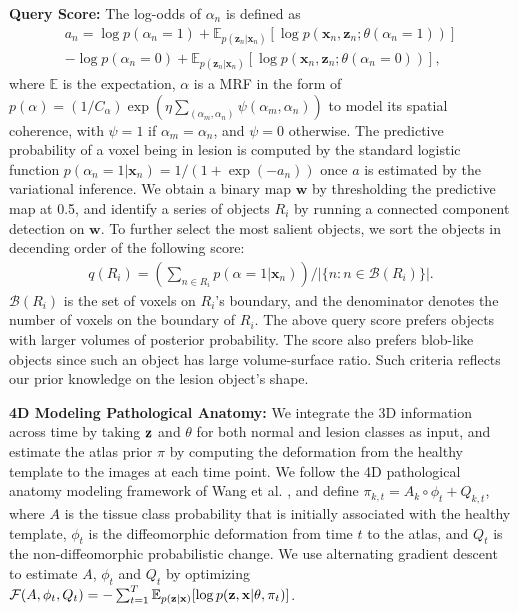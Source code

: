 \documentclass{article}
\renewcommand{\vec}[1]{\boldsymbol{#1}}
\newcommand{\mat}[1]{\text{\bf #1}}
\begin{document}
\noindent\textbf{Query Score: }The log-odds of $\alpha_n$ is defined as
\begin{align*}
  a_n = \log p(\alpha_n=1) + \mathbb{E}_{p(\vec z_n|\vec x_n)} [\log p(\vec x_n, \vec z_n; \theta (\alpha_n=1))]\\
  - \log p(\alpha_n=0) + \mathbb{E}_{p(\vec z_n|\vec x_n)} [\log p(\vec x_n, \vec z_n; \theta (\alpha_n=0))],
\end{align*}
where $\mathbb{E}$ is the expectation, $\alpha$ is a MRF in the form of
$p(\alpha) = (1/C_{\alpha})\exp (\eta \sum_{(\alpha_m, \alpha_n)} \psi(\alpha_m,
\alpha_n ) )$ to model its spatial coherence, with $\psi =1$ if $\alpha_m =
\alpha_n$, and $\psi = 0$ otherwise. The predictive probability of a voxel being
in lesion is computed by the standard logistic function $p(\alpha_n=1|\vec x_n)
= 1/ (1 + \exp (-a_n))$ once $a$ is estimated by the variational inference. We
obtain a binary map $\vec w$ by thresholding the predictive map at 0.5, and
identify a series of objects $R_i$ by running a connected component detection on
$\vec w$. To further select the most salient objects, we sort the objects in
decending order of the following score:
\begin{align}
q(R_i) = \left (\sum_{n\in R_i} p(\alpha = 1| \vec x_n)  \right ) \Big /  \vert\{n: n\in \mathcal{B}(R_i) \}\vert.
\label{eq:score}
\end{align}
$\mathcal{B}(R_i)$ is the set of voxels on $R_i$'s boundary, and the denominator
denotes the number of voxels on the boundary of $R_i$. The above query score
prefers objects with larger volumes of posterior probability. The score also
prefers blob-like objects since such an object has large volume-surface
ratio. Such criteria reflects our prior knowledge on the lesion object's shape.


\noindent\textbf{4D Modeling Pathological Anatomy: }
We integrate the 3D information across time by taking $\mat z$ and $\theta$ for
both normal and lesion classes as input, and estimate the atlas prior $\pi$ by
computing the deformation from the healthy template to the images at each time
point. We follow the 4D pathological anatomy modeling framework of Wang et
al. \cite{WangMBIA2013}, and define $\pi_{k,t} = A_k \circ \phi_t + Q_{k,t}$,
where $A$ is the tissue class probability that is initially associated with the
healthy template, $\phi_t$ is the diffeomorphic deformation from time $t$ to the
atlas, and $Q_t$ is the non-diffeomorphic probabilistic change. We use alternating
gradient descent to estimate $A$, $\phi_t$ and $Q_t$ by optimizing
$\mathcal{F}(A, \phi_t, Q_t) = - \sum_{t=1}^T \mathbb{E}_{p(\mat z| \mat
  x)}[\log p (\mat z, \mat x| \theta, \pi_t)]$.
\end{document}
